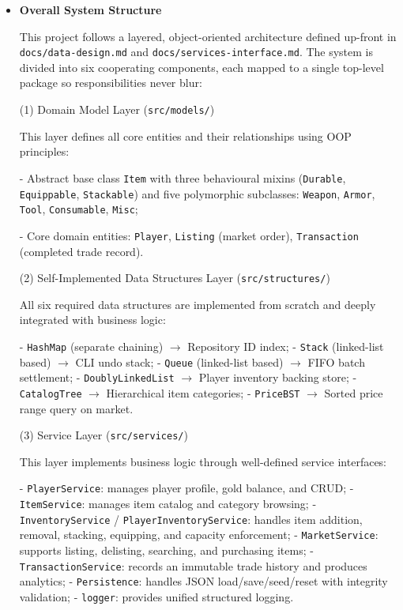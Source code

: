 \documentclass[11pt,a4paper]{article}
\begin{document}
\begin{itemize}
    \item \textbf{Overall System Structure}

This project follows a layered, object-oriented architecture defined up-front in \texttt{docs/data-design.md} and \texttt{docs/services-interface.md}. The system is divided into six cooperating components, each mapped to a single top-level package so responsibilities never blur:

\vspace{1\baselineskip}
(1) Domain Model Layer (\texttt{src/models/})

This layer defines all core entities and their relationships using OOP principles:

- Abstract base class \texttt{Item} with three behavioural mixins (\texttt{Durable}, \texttt{Equippable}, \texttt{Stackable}) and five polymorphic subclasses: \texttt{Weapon}, \texttt{Armor}, \texttt{Tool}, \texttt{Consumable}, \texttt{Misc};

- Core domain entities: \texttt{Player}, \texttt{Listing} (market order), \texttt{Transaction} (completed trade record).

\vspace{1\baselineskip}
(2) Self-Implemented Data Structures Layer (\texttt{src/structures/})

All six required data structures are implemented from scratch and deeply integrated with business logic:

- \texttt{HashMap} (separate chaining) \(\rightarrow\) Repository ID index;
- \texttt{Stack} (linked-list based) \(\rightarrow\) CLI undo stack;
- \texttt{Queue} (linked-list based) \(\rightarrow\) FIFO batch settlement;
- \texttt{DoublyLinkedList} \(\rightarrow\) Player inventory backing store;
- \texttt{CatalogTree} \(\rightarrow\) Hierarchical item categories;
- \texttt{PriceBST} \(\rightarrow\) Sorted price range query on market.

\vspace{1\baselineskip}
(3) Service Layer (\texttt{src/services/})

This layer implements business logic through well-defined service interfaces:

- \texttt{PlayerService}: manages player profile, gold balance, and CRUD;
- \texttt{ItemService}: manages item catalog and category browsing;
- \texttt{InventoryService} / \texttt{PlayerInventoryService}: handles item addition, removal, stacking, equipping, and capacity enforcement;
- \texttt{MarketService}: supports listing, delisting, searching, and purchasing items;
- \texttt{TransactionService}: records an immutable trade history and produces analytics;
- \texttt{Persistence}: handles JSON load/save/seed/reset with integrity validation;
- \texttt{logger}: provides unified structured logging.


\end{itemize}
\end{document}
